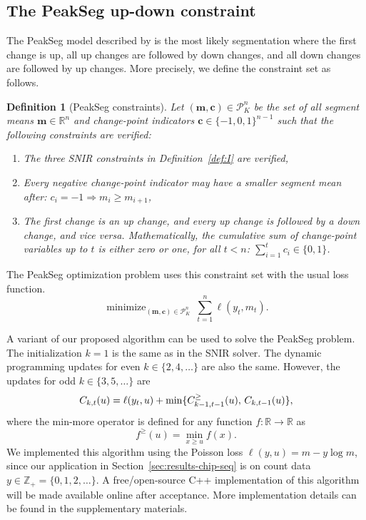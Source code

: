 \documentclass{article}
\newtheorem{definition}{Definition}
\DeclareMathOperator*{\minimize}{minimize}
\newcommand{\ZZ}{\mathbb Z}
\newcommand{\RR}{\mathbb R}
\begin{document}
\subsection{The PeakSeg up-down constraint}
\label{sec:PeakSeg}

The PeakSeg model described by \citet{HOCKING-PeakSeg} is the most
likely segmentation where the first change is up, all up changes are
followed by down changes, and all down changes are followed by up
changes. More precisely, we define the constraint set as follows.
\begin{definition}[PeakSeg constraints]
  \label{def:U}
  Let $(\mathbf m, \mathbf c)\in\mathcal P_K^n$ be the set of all
  segment means $\mathbf m\in\RR^n$ and change-point indicators
  $\mathbf c\in\{-1, 0,1\}^{n-1}$ such that the following constraints
  are verified:
  \begin{enumerate}
  \item The three SNIR constraints in Definition~\ref{def:I} are verified,
  \item Every negative change-point indicator may have a smaller
    segment mean after:
    $c_i = -1 \Rightarrow m_i \geq m_{i+1}$,
  \item The first change is an up change, and every up change is followed by a
    down change, and vice versa. Mathematically, the cumulative sum of
    change-point variables up to $t$ is either zero or one, for all $t<n$:
    $\sum_{i=1}^t c_i \in \{0, 1\}$.
  \end{enumerate}
\end{definition}
The PeakSeg optimization problem uses this constraint set with the usual loss function. 
\begin{equation}
\label{eq:min_PeakSeg}
    \minimize_{
        (\mathbf m, \mathbf c)\in\mathcal P^n_K
      } \ 
\sum_{t=1}^n \ell(y_t, m_t).
\end{equation}

A variant of our proposed algorithm can be used to solve the PeakSeg
problem. The initialization $k=1$ is the same as in the SNIR
solver. The dynamic programming updates for even $k\in\{2, 4, \dots\}$
are also the same. However, the updates for odd $k\in\{3, 5, \dots\}$
are
\begin{equation}
  C_{k,t}(u) = \ell(y_t, u) + \min\{
  C_{k-1,t-1}^\geq(u),\, C_{k,t-1}(u)
  \},
\end{equation}
where the min-more operator is defined for any function $f:\RR\rightarrow\RR$ as
\begin{equation}
  \label{eq:min-more-def}
  f^\geq(u) = \min_{x\geq u} f(x).
\end{equation}
We implemented this algorithm using the Poisson loss
$\ell(y, u) = m - y\log m$, since our application in
Section~\ref{sec:results-chip-seq} is on count data
$y\in\ZZ_+ = \{0, 1, 2, \dots\}$.
A free/open-source C++ implementation of this algorithm will be made
available online after acceptance. More implementation details can be
found in the supplementary materials.
\end{document}
